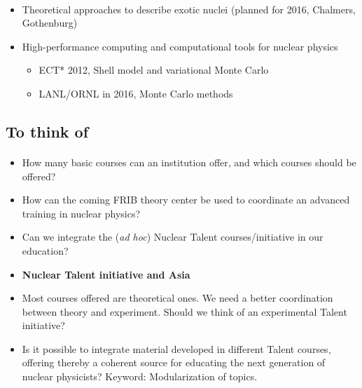 \documentclass[%
twoside,                 %
final,                   %
10pt]{article}
\begin{document}
\paragraph{}
\begin{itemize}
\item Theoretical approaches to describe  exotic nuclei (planned for 2016, Chalmers, Gothenburg)

\item High-performance computing and computational tools for nuclear physics
\begin{itemize}

  \item ECT* 2012, Shell model and variational Monte Carlo

  \item LANL/ORNL in 2016, Monte Carlo methods 
\end{itemize}

\noindent
\end{itemize}

\noindent




\subsection{To think of}

\paragraph{}
\begin{itemize}
\item How many basic courses can an institution offer, and which courses should be offered?

\item How can the coming FRIB theory center be used to coordinate an advanced training in nuclear physics?

\item Can we integrate the (\emph{ad hoc}) Nuclear Talent courses/initiative  in our education? 

\item \textbf{Nuclear Talent initiative and Asia} 

\item Most courses offered are theoretical ones. We need a better coordination between theory and experiment. Should we think of an experimental Talent initiative? 

\item Is it possible to integrate material developed in different Talent courses, offering thereby a coherent source for educating the next generation of nuclear physicists? Keyword: Modularization of topics.
\end{itemize}

\noindent










\printindex
\end{document}
